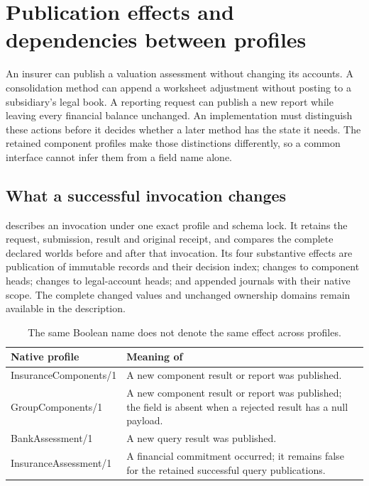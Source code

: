 \section{Publication effects and dependencies between profiles}
\label{sec:profile-effects-composition}

An insurer can publish a valuation assessment without changing its accounts.
A consolidation method can append a worksheet adjustment without posting to a
subsidiary's legal book. A reporting request can publish a new report while
leaving every financial balance unchanged. An implementation must distinguish
these actions before it decides whether a later method has the state it needs.
The retained component profiles make those distinctions differently, so a
common interface cannot infer them from a field name alone.

\subsection{What a successful invocation changes}

 describes an invocation under one exact profile and
schema lock. It retains the request, submission, result and original receipt,
and compares the complete declared worlds before and after that invocation.
Its four substantive effects are publication of immutable records and their
decision index; changes to component heads; changes to legal-account heads;
and appended journals with their native scope. The complete changed values and
unchanged ownership domains remain available in the description.

\begin{table}[htbp]
\centering\small
\begin{tabularx}{\textwidth}{@{}L{0.29\textwidth}X@{}}
\toprule
Native profile & Meaning of  \\
\midrule
InsuranceComponents/1 & A new component result or report was published. \\
GroupComponents/1 & A new component result or report was published; the field
is absent when a rejected result has a null payload. \\
BankAssessment/1 & A new query result was published. \\
InsuranceAssessment/1 & A financial commitment occurred; it remains false
for the retained successful query publications. \\
\bottomrule
\end{tabularx}
\caption{The same Boolean name does not denote the same effect across profiles.}
\label{tab:native-publication-effects}
\end{table}

